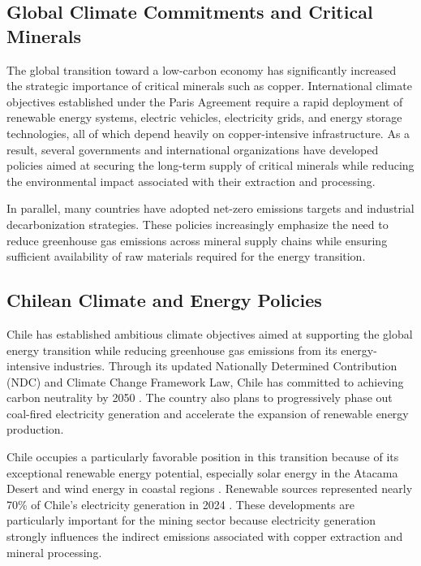 
\subsection{Global Climate Commitments and Critical Minerals}
\label{sec:global climate commitments}
The global transition toward a low-carbon economy has significantly increased the strategic importance of critical minerals such as copper. International climate objectives established under the Paris Agreement require a rapid deployment of renewable energy systems, electric vehicles, electricity grids, and energy storage technologies, all of which depend heavily on copper-intensive infrastructure. As a result, several governments and international organizations have developed policies aimed at securing the long-term supply of critical minerals while reducing the environmental impact associated with their extraction and processing.

In parallel, many countries have adopted net-zero emissions targets and industrial decarbonization strategies. These policies increasingly emphasize the need to reduce greenhouse gas emissions across mineral supply chains while ensuring sufficient availability of raw materials required for the energy transition.


\subsection{Chilean Climate and Energy Policies}

Chile has established ambitious climate objectives aimed at supporting the global energy transition while reducing greenhouse gas emissions from its energy-intensive industries. Through its updated Nationally Determined Contribution (NDC) and Climate Change Framework Law, Chile has committed to achieving carbon neutrality by 2050 \cite{CAT2020}. The country also plans to progressively phase out coal-fired electricity generation and accelerate the expansion of renewable energy production.

Chile occupies a particularly favorable position in this transition because of its exceptional renewable energy potential, especially solar energy in the Atacama Desert and wind energy in coastal regions \cite{SolarAtlas2019}. Renewable sources represented nearly 70\% of Chile’s electricity generation in 2024 \cite{EnergiaEstrategica2025}. These developments are particularly important for the mining sector because electricity generation strongly influences the indirect emissions associated with copper extraction and mineral processing.


